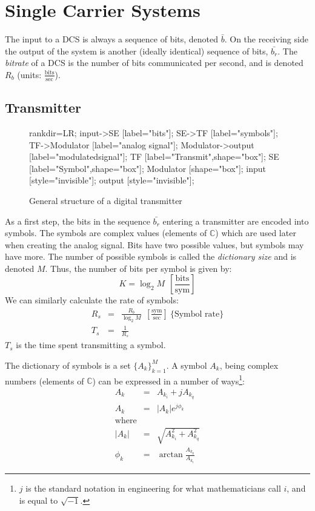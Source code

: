 \documentclass[onecolumn,x11names,technote,twoside,a4paper,10pt,english]{IEEEtran}
\begin{document}
\section{Single Carrier Systems}
\label{sec:single-carrier}

The input to a DCS is always a sequence of bits, denoted $\bar{b}$. On the receiving side the output of the system is another (ideally identical) sequence of bits, $\bar{b_r}$. The \emph{bitrate} of a DCS is the number of bits communicated per second, and is denoted $R_b$ (units: $\frac{\text{bits}}{\text{sec}}$).

\subsection{Transmitter}
\label{sec:sc-trans}

\begin{figure}[h!]
  \centering
  \begin{dotpic}[width=5in]
    rankdir=LR; 
    input->SE [label="bits"];
    SE->TF [label="symbols"];
    TF->Modulator [label="analog signal"];
    Modulator->output [label="modulated\nanalog signal"];
    TF [label="Transmit\nFilter",shape="box"];
    SE [label="Symbol\nEncoder",shape="box"];
    Modulator [shape="box"];
    input [style="invisible"];
    output [style="invisible"];
  \end{dotpic}
  \caption{General structure of a digital transmitter}
  \label{fig:DCS-Trans}
\end{figure}

As a first step, the bits in the sequence $\bar{b_r}$ entering a transmitter are encoded into symbols. The symbols are complex values (elements of $\mathbb{C}$) which are used later when creating the analog signal. Bits have two possible values, but symbols may have more. The number of possible symbols is called the \emph{dictionary size} and is denoted $M$. Thus, the number of bits per symbol is given by:
\begin{equation*}
  K = \log_2{M}\ \ \left[\frac{\text{bits}}{\text{sym}}\right]
\end{equation*}
We can similarly calculate the rate of symbols:
\begin{eqnarray*}
R_s &=& \frac{R_b}{\log_2{M}}\ \ \left[\frac{\text{sym}}{\text{sec}}\right]\ \{\text{Symbol rate}\} \\
T_s &=& \frac{1}{R_s}
\end{eqnarray*}
$T_s$ is the time spent transmitting a symbol. 

The dictionary of symbols is a set $\{A_k\}_{k=1}^M$. A symbol $A_k$, being complex numbers (elements of $\mathbb{C}$) can be expressed in a number of ways\footnote{$j$ is the standard notation in engineering for what mathematicians call $i$, and is equal to $\sqrt{-1}$.}:
\begin{eqnarray*}
  A_k &=& A_{k_i} + j A_{k_q} \\
  A_k &=& |A_k|e^{j\phi_k} \\
  \text{where} \\
  |A_k| &=& \sqrt{A_{k_i}^2 + A_{k_q}^2} \\
  \phi_k &=& \arctan{\frac{A_{k_q}}{A_{k_i}}}
\end{eqnarray*}
\end{document}
